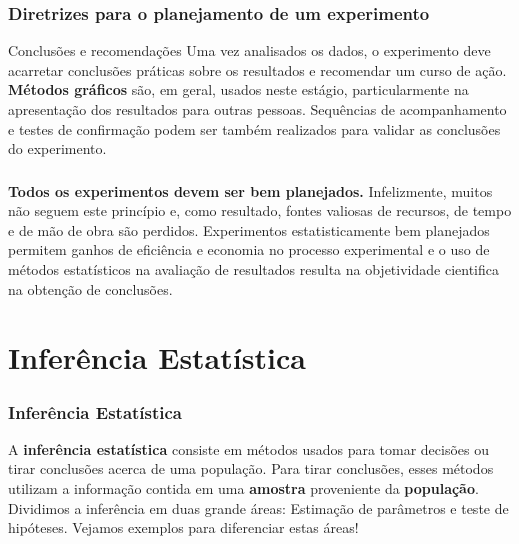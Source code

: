 \documentclass[14pt,aspectratio=1610]{beamer}
\begin{document}
\begin{frame}{}
\frametitle{Diretrizes para o planejamento de um experimento}
\begin{block}{Conclusões e recomendações}
\justifying
Uma vez analisados os dados, o experimento deve acarretar conclusões práticas sobre os resultados e recomendar um curso de ação. \textbf{Métodos gráficos} são, em geral, 
usados neste estágio, particularmente na apresentação dos resultados para outras pessoas. Sequências de acompanhamento e testes de confirmação podem ser também 
realizados para validar as conclusões do experimento.
\end{block}
\end{frame}


\begin{frame}{}
\frametitle{}
\begin{block}{}
\justifying
 {\bf Todos os experimentos devem ser bem planejados.} Infelizmente, muitos não seguem este princípio e, como resultado, fontes valiosas de recursos, de tempo e 
de mão de obra são perdidos. Experimentos estatisticamente bem planejados permitem ganhos de eficiência e economia no processo experimental e o uso de métodos 
estatísticos na avaliação de resultados resulta na objetividade cientifica na obtenção de conclusões.
 \end{block}
\end{frame}

\section{Inferência Estatística}
\begin{frame}{}
\frametitle{Inferência Estatística}
\begin{block}{}
\justifying
A \textbf{inferência estatística} consiste em métodos usados para tomar decisões ou tirar 
conclusões acerca de uma população. Para tirar conclusões, esses métodos utilizam a 
informação contida em uma \textbf{amostra} proveniente da \textbf{população}. Dividimos a inferência em 
duas grande áreas: Estimação de parâmetros e teste de hipóteses. Vejamos exemplos 
para diferenciar estas áreas! 
 \end{block}
\end{frame}
\end{document}
